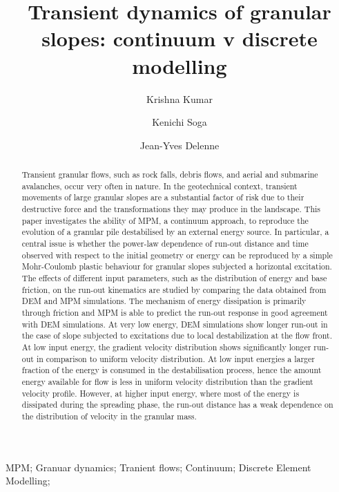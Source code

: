 \documentclass[3p,times,procedia,number]{elsarticle}
\begin{document}
\begin{frontmatter}



\title{Transient dynamics of granular slopes: continuum v discrete modelling}

\author[a]{Krishna Kumar}
\author[a,b]{Kenichi Soga}
\author[c]{Jean-Yves Delenne}

\address[a]{Department of Engineering, University of Cambridge, Cambridge CB2
  1PZ, UK}
\address[b]{Department of Civil Engineering, University of California,
  Berkeley, USA}
\address[c]{University of Montpellier II, France}

\begin{abstract}
Transient granular flows, such as rock falls, debris flows, and aerial and
submarine avalanches, occur very often in nature. In the geotechnical
context, transient movements of large granular slopes are a substantial
factor of risk due to their destructive force and the transformations they
may produce in the landscape. This paper investigates the ability of MPM, a
continuum approach, to reproduce the evolution of a granular pile
destabilised by an external energy source. In particular, a central issue is
whether the power-law dependence of run-out distance and time observed with
respect to the initial geometry or energy can be reproduced by a simple
Mohr-Coulomb plastic behaviour for granular slopes subjected a horizontal
excitation. The effects of different input parameters, such as the
distribution of energy and base friction, on the run-out kinematics are
studied by comparing the data obtained from DEM and MPM simulations. The
mechanism of energy dissipation is primarily through friction and MPM is able
to predict the run-out response in good agreement with DEM simulations. At
very low energy, DEM simulations show longer run-out in the case of slope
subjected to excitations due to local destabilization at the flow front. At
low input energy, the gradient velocity distribution shows significantly
longer run-out in comparison to uniform velocity distribution. At low input
energies a larger fraction of the energy is consumed in the destabilisation
process, hence the amount energy available for flow is less in uniform
velocity distribution than the gradient velocity profile. However, at higher
input energy, where most of the energy is dissipated during the spreading
phase, the run-out distance has a weak dependence on the distribution of
velocity in the granular mass.
\end{abstract}

\begin{keyword}
MPM; Granuar dynamics; Tranient flows; Continuum; 
Discrete Element Modelling;



\end{keyword}
\end{frontmatter}
\end{document}
